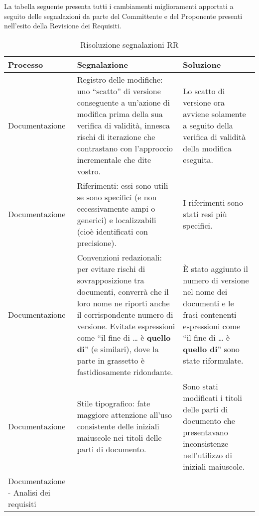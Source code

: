 			La tabella seguente presenta tutti i cambiamenti miglioramenti apportati a seguito delle segnalazioni da parte del Committente e del Proponente presenti nell'esito della Revisione dei Requisiti.
			\begin{longtable}{ 
				>{\centering}p{} 
				>{\centering}p{}
				>{\centering\arraybackslash}p{}}
	
				\caption {Risoluzione segnalazioni RR} \\
		
				\textbf{\color{white}Processo} &
				\textbf{\color{white}Segnalazione} &
				\textbf{\color{white}Soluzione}
				\tabularnewline  
				\endhead
		
		
				Documentazione
					&
				 Registro delle modifiche: uno “scatto” di versione conseguente a un’azione di modifica prima della sua verifica di validità, innesca rischi di iterazione che contrastano con l’approccio incrementale che dite vostro. 
					&
				Lo scatto di versione ora avviene solamente a seguito della verifica di validità della modifica eseguita.
					\\
			
				Documentazione
					&
				Riferimenti: essi sono utili se sono specifici (e non eccessivamente ampi o generici) e localizzabili (cioè identificati con precisione).
					&
				I riferimenti sono stati resi più specifici.
					\\
		
				Documentazione
					&
				Convenzioni redazionali: per evitare rischi di sovrapposizione tra documenti, converrà che il loro nome ne riporti anche il corrispondente numero di versione. Evitate espressioni come “il fine di … è \textbf{quello di}” (e similari), dove la parte in grassetto è fastidiosamente ridondante.
					&
				È stato aggiunto il numero di versione nel nome dei documenti e le frasi contenenti espressioni come “il fine di … è \textbf{quello di}” sono state riformulate.
					\\
		
				Documentazione
					&
				Stile tipografico: fate maggiore attenzione all’uso consistente delle iniziali maiuscole nei titoli delle parti di documento.
					&
				Sono stati modificati i titoli delle parti di documento che presentavano inconsistenze nell'utilizzo di iniziali maiuscole.
					\\
				Documentazione - Analisi dei requisiti
					&
			

\end{longtable}
